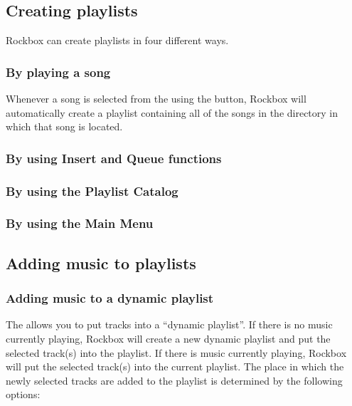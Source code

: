 \subsection{Creating playlists}

Rockbox can create playlists in four different ways. 

\subsubsection{By playing a song}

Whenever a song is selected from the  using the 
 button, Rockbox will automatically create a playlist 
containing  all of the songs in the directory in which that song is located.


\subsubsection{By using Insert and Queue functions}

\subsubsection{By using the Playlist Catalog}

\subsubsection{By using the Main Menu}

\subsection{Adding music to playlists}
  
\subsubsection{\label{ref:Playlistsubmenu}Adding music to a dynamic playlist} 
The  allows you to put tracks into a 
``dynamic playlist''. If there is no music currently playing, Rockbox will 
create a new dynamic playlist and put the selected track(s) into the 
playlist.  If there is music currently playing, Rockbox will put the 
selected track(s) into the current playlist.  The place in which the newly 
selected tracks are added to the playlist is determined by the following 
options:

